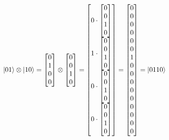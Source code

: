 \documentclass{article}
\begin{document}
\begin{center}
	$
	\ket{01} \otimes \ket{10} =
	\begin{bmatrix}
		0 \\
		1 \\
		0 \\
		0 \\
	\end{bmatrix}
	\otimes
	\begin{bmatrix}
		0 \\
		0 \\
		1 \\
		0 \\
	\end{bmatrix}
	=
	\begin{bmatrix}
		0 \cdot
		\begin{bmatrix}
			0 \\
			0 \\
			1 \\
			0 \\
		\end{bmatrix} \\
		1 \cdot
		\begin{bmatrix}
			0 \\
			0 \\
			1 \\
			0 \\
		\end{bmatrix} \\
		0 \cdot
		\begin{bmatrix}
			0 \\
			0 \\
			1 \\
			0 \\
		\end{bmatrix} \\
		0 \cdot
		\begin{bmatrix}
			0 \\
			0 \\
			1 \\
			0 \\
		\end{bmatrix} \\
	\end{bmatrix}
	=
	\begin{bmatrix}
		0 \\
		0 \\
		0 \\
		0 \\
		0 \\
		0 \\
		1 \\
		0 \\
		0 \\
		0 \\
		0 \\
		0 \\
		0 \\
		0 \\
		0 \\
		0 \\
	\end{bmatrix}
	=	
	\ket{0110}
	$
\end{center}
\end{document}
